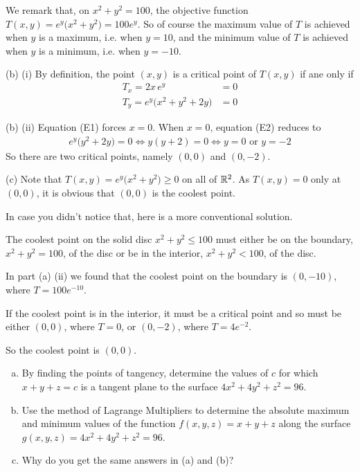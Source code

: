 \begin{solution}
We remark that, on $x^2+y^2=100$, the objective function 
$T(x,y) = e^y\big(x^2+y^2\big) = 100 e^y$. So of course the maximum value of
$T$ is achieved when $y$ is a maximum, i.e. when $y=10$, 
and the minimum value of
$T$ is achieved when $y$ is a minimum, i.e. when $y=-10$.

(b) (i) By definition, the point $(x,y)$ is a critical point of $T(x,y)$ if ane only if
\begin{align*}
T_x = 2x\,e^y &=0 \tag{E1}\\
T_y = e^y\big(x^2+y^2+2y\big) &=0  \tag{E2}
\end{align*}

(b) (ii) 
Equation (E1) forces $x=0$. When $x=0$, equation (E2) reduces to
\begin{align*}
e^y\big(y^2+2y\big) =0 
\iff  y(y+2)=0
\iff y=0\text{ or }y=-2
\end{align*}
So there are two critical points, namely $(0,0)$ and $(0,-2)$.

(c) 
Note that $T(x,y) = e^y\big(x^2+y^2\big)\ge 0$ on all of $\mathbb{R}^2$.
As $T(x,y)=0$ only at $(0,0)$, it is obvious that $(0,0)$ is the coolest point.


In case you didn't notice that, here is a more conventional solution.

The coolest point on the solid disc $x^2+y^2\le 100$
must either be on the boundary, $x^2+y^2= 100$, of the disc
or be in the interior, $x^2+y^2 < 100$, of the disc.
 
In part (a) (ii) we found that the coolest point on the boundary 
is $(0,-10)$, where $T=100 e^{-10}$. 


If the coolest point is in the interior, it must be a critical point and so must be 
either $(0,0)$, where $T=0$, or $(0,-2)$, where $T= 4e^{-2}$.

So the coolest point is $(0,0)$.
\end{solution}



\begin{question} [M200 2002D] %
\begin{enumerate}[(a)]
\item 
By finding the points of tangency, determine the values of $c$ for 
which $x+y+z=c$ is a tangent plane to the surface $4x^2+4y^2+z^2=96$.
\item
Use the method of Lagrange Multipliers to determine the absolute
maximum and minimum values of the function $f(x,y,z)=x+y+z$ along the surface
$g(x,y,z)=4x^2+4y^2+z^2=96$.
\item
Why do you get the same answers in (a) and (b)?
\end{enumerate}
\end{question}

